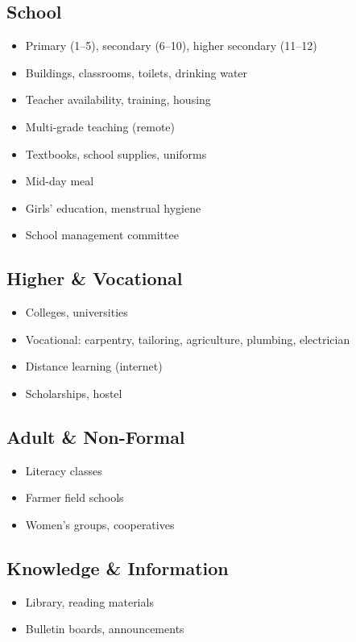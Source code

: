 \documentclass[11pt,a4paper]{article}
\begin{document}
\subsection{School}
\begin{itemize}
    \item Primary (1--5), secondary (6--10), higher secondary (11--12)
    \item Buildings, classrooms, toilets, drinking water
    \item Teacher availability, training, housing
    \item Multi-grade teaching (remote)
    \item Textbooks, school supplies, uniforms
    \item Mid-day meal
    \item Girls' education, menstrual hygiene
    \item School management committee
\end{itemize}

\subsection{Higher \& Vocational}
\begin{itemize}
    \item Colleges, universities
    \item Vocational: carpentry, tailoring, agriculture, plumbing, electrician
    \item Distance learning (internet)
    \item Scholarships, hostel
\end{itemize}

\subsection{Adult \& Non-Formal}
\begin{itemize}
    \item Literacy classes
    \item Farmer field schools
    \item Women's groups, cooperatives
\end{itemize}

\subsection{Knowledge \& Information}
\begin{itemize}
    \item Library, reading materials
    \item Bulletin boards, announcements
\end{itemize}
\end{document}
